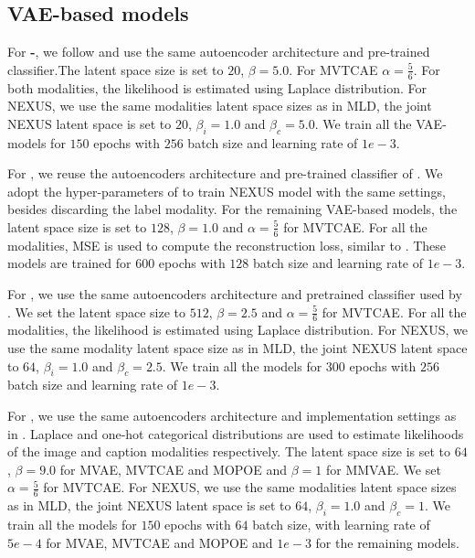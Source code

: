 \subsection{VAE-based models}
For \textbf{\mnist-\svhn}, we follow \cite{sutter2021generalized,mmvaeShi2019} and use the same autoencoder architecture and pre-trained classifier.The latent space size is set to $20$, $\beta = 5.0 $. For \gls{MVTCAE} $\alpha = \frac{5}{6} $. For both modalities, the likelihood is estimated using Laplace distribution.
For \gls{NEXUS}, we use the same modalities latent space sizes as in \gls{MLD}, the joint \gls{NEXUS} latent space is set to $20$, $\beta_i = 1.0 $ and $\beta_c = 5.0$. We train all the \gls{VAE}-models for $150$ epochs with $256$ batch size and learning rate of $1e-3$.


For \textbf{\mhd}, we reuse the autoencoders architecture and pre-trained classifier of \cite{Vasco2022}. We adopt the hyper-parameters of \cite{Vasco2022} to train \gls{NEXUS} model with the same settings, besides discarding the label modality. For the remaining \gls{VAE}-based models, the latent space size is set to $128$, $\beta = 1.0 $ and $\alpha = \frac{5}{6} $ for \gls{MVTCAE}. For all the modalities, \gls{MSE} is used to compute the reconstruction loss, similar to \cite{Vasco2022}. These models are trained for $600$ epochs with  $128$ batch size and learning rate of $1e-3$.



For \textbf{\polymnist}, we use the same autoencoders architecture and pretrained classifier used by \cite{sutter2021generalized, tcmvaehwang21}.
We set the latent space size to $512$, $\beta = 2.5 $ and $\alpha = \frac{5}{6} $ for \gls{MVTCAE}. For all the modalities, the likelihood is estimated using Laplace distribution. For \gls{NEXUS}, we use the same modality latent space size as in \gls{MLD}, the joint \gls{NEXUS} latent space to $64$, $\beta_i = 1.0 $ and $\beta_c = 2.5$. We train all the models for $300$ epochs with $256$ batch size and learning rate of $1e-3$.


For \textbf{\cub}, we use the same autoencoders architecture and implementation settings as in \cite{Daunhawer2021}. Laplace and one-hot categorical distributions are used to estimate likelihoods of the image and caption modalities respectively. The latent space size is set to $64$, $\beta = 9.0 $ for \gls{MVAE}, \gls{MVTCAE} and \gls{MOPOE} and $\beta =1$ for \gls{MMVAE}. We set $\alpha = \frac{5}{6} $ for \gls{MVTCAE}.
For \gls{NEXUS}, we use the same modalities latent space sizes as in \gls{MLD}, the joint \gls{NEXUS} latent space is set to $64$, $\beta_i = 1.0 $ and $\beta_c = 1$. We train all the models for $150$ epochs with $64$ batch size, with learning rate of $5e-4$ for \gls{MVAE}, \gls{MVTCAE} and \gls{MOPOE} and $1e-3$ for the remaining models.

